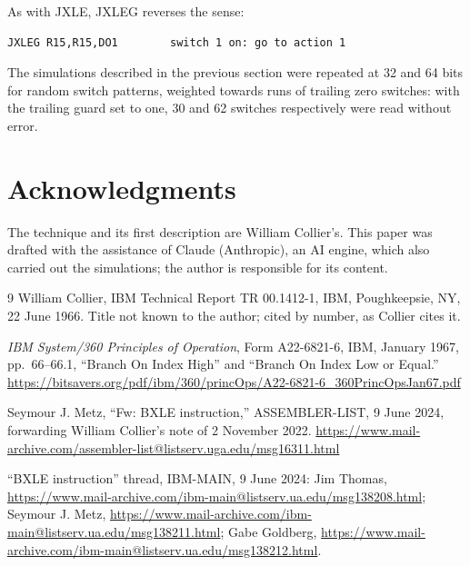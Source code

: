\documentclass[11pt]{article}
\begin{document}
As with JXLE, JXLEG reverses the sense:

\begin{Verbatim}[fontsize=\small]
         JXLEG R15,R15,DO1        switch 1 on: go to action 1
\end{Verbatim}

The simulations described in the previous section were repeated at 32 and 64
bits for random switch patterns, weighted towards runs of trailing zero
switches: with the trailing guard set to one, 30 and 62 switches respectively
were read without error.

\section*{Acknowledgments}
The technique and its first description are William Collier's. This paper
was drafted with the assistance of Claude (Anthropic), an AI engine, which
also carried out the simulations; the author is responsible for its content.

\begin{thebibliography}{9}
William Collier, IBM Technical Report TR 00.1412-1, IBM, Poughkeepsie, NY,
22 June 1966. Title not known to the author; cited by number, as Collier
cites it.

\emph{IBM System/360 Principles of Operation}, Form A22-6821-6, IBM,
January 1967, pp.~66--66.1, ``Branch On Index High'' and ``Branch On Index
Low or Equal.''
\url{https://bitsavers.org/pdf/ibm/360/princOps/A22-6821-6_360PrincOpsJan67.pdf}

Seymour J. Metz, ``Fw: BXLE instruction,'' ASSEMBLER-LIST, 9 June 2024,
forwarding William Collier's note of 2 November 2022.
\url{https://www.mail-archive.com/assembler-list@listserv.uga.edu/msg16311.html}

``BXLE instruction'' thread, IBM-MAIN, 9 June 2024: Jim Thomas,
\url{https://www.mail-archive.com/ibm-main@listserv.ua.edu/msg138208.html};
Seymour J. Metz,
\url{https://www.mail-archive.com/ibm-main@listserv.ua.edu/msg138211.html};
Gabe Goldberg,
\url{https://www.mail-archive.com/ibm-main@listserv.ua.edu/msg138212.html}.
\end{thebibliography}
\end{document}
